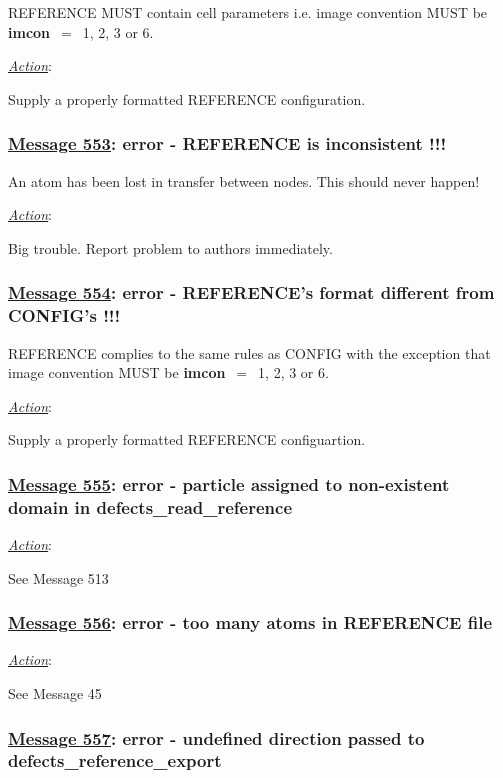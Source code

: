 REFERENCE MUST contain cell parameters i.e. image convention MUST be {\bf imcon}~$=$~1, 2, 3 or 6.

\noindent \underline{\em Action}:

Supply a properly formatted REFERENCE configuration.

\subsubsection*{\underline{Message 553}: error - REFERENCE is inconsistent !!!}

An atom has been lost in transfer between nodes.  This should
never happen!

\noindent \underline{\em Action}:

Big trouble.  Report problem to authors immediately.

\subsubsection*{\underline{Message 554}: error - REFERENCE's format different from CONFIG's !!!}

REFERENCE complies to the same rules as CONFIG with the exception
that image convention MUST be {\bf imcon}~$=$~1, 2, 3 or 6.

\noindent \underline{\em Action}:

Supply a properly formatted REFERENCE configuartion.

\subsubsection*{\underline{Message 555}: error - particle assigned to non-existent domain in defects\_read\_reference}

\noindent \underline{\em Action}:

See Message 513

\subsubsection*{\underline{Message 556}: error - too many atoms in REFERENCE file}

\noindent \underline{\em Action}:

See Message 45

\subsubsection*{\underline{Message 557}: error - undefined direction passed to defects\_reference\_export}

